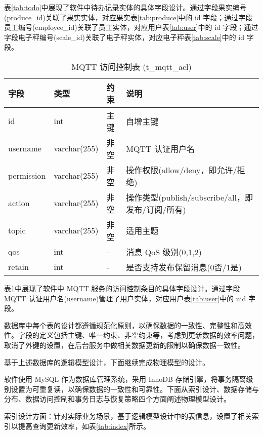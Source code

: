 表\ref{tab:todo}中展现了软件中待办记录实体的具体字段设计。通过字段果实编号(produce\_id)关联了果实实体，对应果实表\ref{tab:produce}中的 id 字段；通过字段员工编号(employee\_id)关联了员工实体，对应用户表\ref{tab:user}中的 id 字段；通过字段电子秤编号(scale\_id)关联了电子秤实体，对应电子秤表\ref{tab:scale}中的 id 字段。

\begin{table}[H]
\centering
\caption{MQTT 访问控制表 (t\_mqtt\_acl)}
\label{tab:mqttacl}
\begin{tabular}{|l|l|l|l|}
\hline
字段 & 类型 & 约束 & 说明 \\
\hline
id & int & 主键 & 自增主键 \\
username & varchar(255) & 非空 & MQTT 认证用户名 \\
permission & varchar(255) & 非空 & 操作权限(allow/deny，即允许/拒绝) \\
action & varchar(255) & 非空 & 操作类型(publish/subscribe/all，即发布/订阅/所有) \\
topic & varchar(255) & 非空 & 适用主题 \\
qos & int & - & 消息 QoS 级别(0,1,2) \\
retain & int & - & 是否支持发布保留消息(0否/1是) \\
\hline
\end{tabular}
\end{table}

表\ref{tab:mqttacl}中展现了软件中 MQTT 服务的访问控制条目的具体字段设计。通过字段 MQTT 认证用户名(username)管理了用户实体，对应用户表\ref{tab:user}中的 uid 字段。

数据库中每个表的设计都遵循规范化原则，以确保数据的一致性、完整性和高效性。字段的定义包括主键、唯一约束、非空约束等，考虑到更新数据的效率问题，取消了外键的设置，在后台服务中做相关数据更新的限制以确保数据一致性。

基于上述数据库的逻辑模型设计，下面继续完成物理模型的设计。

软件使用 MySQL 作为数据库管理系统，采用 InnoDB 存储引擎，将事务隔离级别设置为可重复读，以确保数据的一致性和可靠性。下面从索引设计、数据存储与分布、数据访问控制和事务日志与恢复策略四个方面阐述物理模型设计。

索引设计方面：针对实际业务场景，基于逻辑模型设计中的表信息，设置了相关索引以提高查询更新效率，如表\ref{tab:index}所示。

